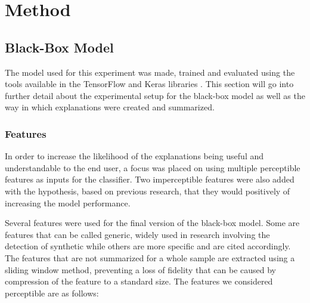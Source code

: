 \documentclass{article}
\begin{document}
	\section{Method}
		\subsection{Black-Box Model}
		The model used for this experiment was made, trained and evaluated using the tools
		available in the TensorFlow and Keras libraries \cite{tensorflow2015-whitepaper}. This
		section will go into further detail about the experimental setup for the black-box model
		as well as the way in which explanations were created and summarized.
			\subsubsection{Features}
			In order to increase the likelihood of the explanations being useful and
			understandable to the end user, a focus was placed on using multiple perceptible
			features as inputs for the classifier. Two imperceptible features were also added with
			the hypothesis, based on previous research, that they would positively of increasing
			the model performance.
			\par
			Several features were used for the final version of the black-box model. Some are
			features that can be called generic, widely used in research involving the detection
			of synthetic while others are more specific and are cited accordingly. The features
			that are not summarized for a whole sample are extracted using a sliding window method,
			preventing a loss of fidelity that can be caused by compression of the feature to a
			standard size. The features we considered perceptible are as follows:
\end{document}
